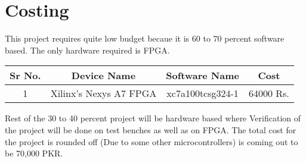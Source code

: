 
\chapter{Costing}
\label{Chapter10}

This project requires quite low budget becaue it is 60 to 70 percent software based. The only hardware required is FPGA.

\begin{center}

\begin{tabular}{|c|c|c|c|} 
 \hline
Sr No. & Device Name & Software Name & Cost \\ [0.5ex] 
 \hline
 1 & Xilinx's Nexys A7 FPGA & xc7a100tcsg324-1 & 64000 Rs.\\ [1ex]
 \hline
\end{tabular}

\end{center}

Rest of the 30 to 40 percent project will be hardware based where Verification of the project will be done on test benches as well as on FPGA. The total cost for the project is rounded off (Due to some other microcontrollers) is coming out to be 70,000 PKR. 